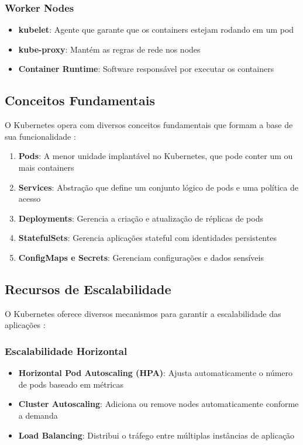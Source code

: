 \subsubsection{Worker Nodes}
\begin{itemize}
\item \textbf{kubelet}: Agente que garante que os containers estejam rodando em um pod
\item \textbf{kube-proxy}: Mantém as regras de rede nos nodes
\item \textbf{Container Runtime}: Software responsável por executar os containers
\end{itemize}

\subsection{Conceitos Fundamentais}
O Kubernetes opera com diversos conceitos fundamentais que formam a base de sua funcionalidade \cite{hightower2019kubernetes}:
\begin{enumerate}
\item \textbf{Pods}: A menor unidade implantável no Kubernetes, que pode conter um ou mais containers
\item \textbf{Services}: Abstração que define um conjunto lógico de pods e uma política de acesso
\item \textbf{Deployments}: Gerencia a criação e atualização de réplicas de pods
\item \textbf{StatefulSets}: Gerencia aplicações stateful com identidades persistentes
\item \textbf{ConfigMaps e Secrets}: Gerenciam configurações e dados sensíveis
\end{enumerate}

\subsection{Recursos de Escalabilidade}
O Kubernetes oferece diversos mecanismos para garantir a escalabilidade das aplicações \cite{luksa2021kubernetes}:
\subsubsection{Escalabilidade Horizontal}
\begin{itemize}
\item \textbf{Horizontal Pod Autoscaling (HPA)}: Ajusta automaticamente o número de pods baseado em métricas
\item \textbf{Cluster Autoscaling}: Adiciona ou remove nodes automaticamente conforme a demanda
\item \textbf{Load Balancing}: Distribui o tráfego entre múltiplas instâncias de aplicação
\end{itemize}

